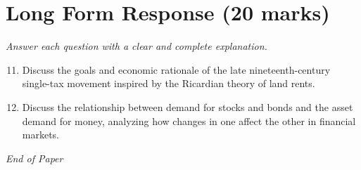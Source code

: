 \documentclass[12pt]{article}
\begin{document}
\section*{Long Form Response (20 marks)}
\textit{Answer each question with a clear and complete explanation.}
\begin{enumerate}[label=\arabic*.]
\setcounter{enumi}{10}
\item Discuss the goals and economic rationale of the late nineteenth-century single-tax movement inspired by the Ricardian theory of land rents.
\item Discuss the relationship between demand for stocks and bonds and the asset demand for money, analyzing how changes in one affect the other in financial markets.
\end{enumerate}

\vfill
\noindent\textit{End of Paper}
\end{document}
